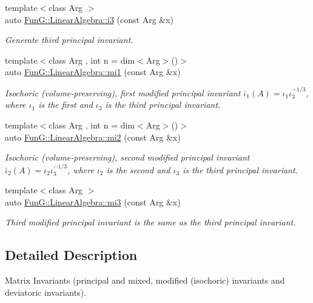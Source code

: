 \begin{DoxyCompactItemize}
{\footnotesize template$<$class Arg $>$ }\\auto \hyperlink{group__InvariantGroup_gae1ad80b4b2f34a10564114fad28bc313}{Fun\-G\-::\-Linear\-Algebra\-::i3} (const Arg \&x)
\begin{DoxyCompactList}\small\item\em Generate third principal invariant. \end{DoxyCompactList}\item 
{\footnotesize template$<$class Arg , int n = dim$<$\-Arg$>$()$>$ }\\auto \hyperlink{group__InvariantGroup_ga7eed5e2661171d81e192ac1db791244c}{Fun\-G\-::\-Linear\-Algebra\-::mi1} (const Arg \&x)
\begin{DoxyCompactList}\small\item\em Isochoric (volume-\/preserving), first modified principal invariant $ \bar\iota_1(A)=\iota_1\iota_3^{-1/3} $, where $\iota_1$ is the first and $\iota_3$ is the third principal invariant. \end{DoxyCompactList}\item 
{\footnotesize template$<$class Arg , int n = dim$<$\-Arg$>$()$>$ }\\auto \hyperlink{group__InvariantGroup_ga9d219c5c48cce1d3af60345916963524}{Fun\-G\-::\-Linear\-Algebra\-::mi2} (const Arg \&x)
\begin{DoxyCompactList}\small\item\em Isochoric (volume-\/preserving), second modified principal invariant $ \bar\iota_2(A)=\iota_2\iota_3^{-1/3} $, where $\iota_2$ is the second and $\iota_3$ is the third principal invariant. \end{DoxyCompactList}\item 
{\footnotesize template$<$class Arg $>$ }\\auto \hyperlink{group__InvariantGroup_gab82dd139779c560055fec0259c451eff}{Fun\-G\-::\-Linear\-Algebra\-::mi3} (const Arg \&x)
\begin{DoxyCompactList}\small\item\em Third modified principal invariant is the same as the third principal invariant. \end{DoxyCompactList}\end{DoxyCompactItemize}


\subsection{Detailed Description}
Matrix Invariants (principal and mixed, modified (isochoric) invariants and deviatoric invariants). 


